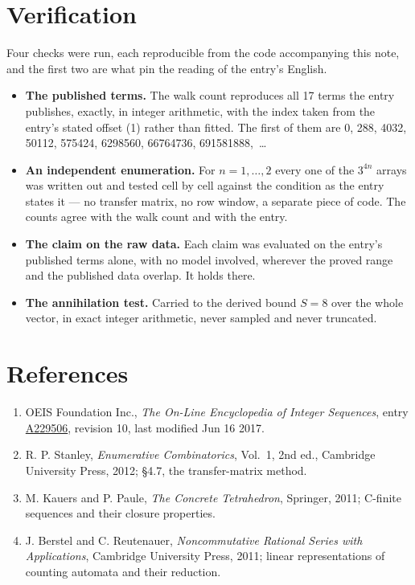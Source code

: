 \documentclass[11pt]{article}
\theoremstyle{definition}
\begin{document}
\section{Verification}

Four checks were run, each reproducible from the code accompanying this note, and the first two are what pin the reading of the entry's English.

\begin{itemize}

\item {\bfseries The published terms.} The walk count reproduces all 17 terms the entry publishes, exactly, in integer arithmetic, with the index taken from the entry's stated offset (1) rather than fitted. The first of them are 0, 288, 4032, 50112, 575424, 6298560, 66764736, 691581888,~\dots

\item {\bfseries An independent enumeration.} For $n = 1,\dots,2$ every one of the $3^{4n}$ arrays was written out and tested cell by cell against the condition as the entry states it --- no transfer matrix, no row window, a separate piece of code. The counts agree with the walk count and with the entry.

\item {\bfseries The claim on the raw data.} Each claim was evaluated on the entry's published terms alone, with no model involved, wherever the proved range and the published data overlap. It holds there.

\item {\bfseries The annihilation test.} Carried to the derived bound $S = 8$ over the whole vector, in exact integer arithmetic, never sampled and never truncated.

\end{itemize}

\section{References}

\begin{enumerate}

\item OEIS Foundation Inc., \emph{The On-Line Encyclopedia of Integer Sequences}, entry \href{https://oeis.org/A229506}{A229506}, revision 10, last modified Jun 16 2017.

\item R. P. Stanley, \emph{Enumerative Combinatorics}, Vol.~1, 2nd ed., Cambridge University Press, 2012; \S4.7, the transfer-matrix method.

\item M. Kauers and P. Paule, \emph{The Concrete Tetrahedron}, Springer, 2011; C-finite sequences and their closure properties.

\item J. Berstel and C. Reutenauer, \emph{Noncommutative Rational Series with Applications}, Cambridge University Press, 2011; linear representations of counting automata and their reduction.

\end{enumerate}
\end{document}
